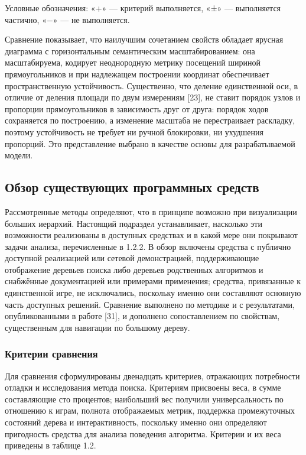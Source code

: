 Условные обозначения: «+» — критерий выполняется, «±» — выполняется частично, «−» — не выполняется.

Сравнение показывает, что наилучшим сочетанием свойств обладает ярусная диаграмма с горизонтальным семантическим масштабированием: она масштабируема, кодирует неоднородную метрику посещений шириной прямоугольников и при надлежащем построении координат обеспечивает пространственную устойчивость. Существенно, что деление единственной оси, в отличие от деления площади по двум измерениям [23], не ставит порядок узлов и пропорции прямоугольников в зависимость друг от друга: порядок ходов сохраняется по построению, а изменение масштаба не перестраивает раскладку, поэтому устойчивость не требует ни ручной блокировки, ни ухудшения пропорций. Это представление выбрано в качестве основы для разрабатываемой модели.

\subsection{Обзор существующих программных средств}

Рассмотренные методы определяют, что в принципе возможно при визуализации больших иерархий. Настоящий подраздел устанавливает, насколько эти возможности реализованы в доступных средствах и в какой мере они покрывают задачи анализа, перечисленные в 1.2.2. В обзор включены средства с публично доступной реализацией или сетевой демонстрацией, поддерживающие отображение деревьев поиска либо деревьев родственных алгоритмов и снабжённые документацией или примерами применения; средства, привязанные к единственной игре, не исключались, поскольку именно они составляют основную часть доступных решений. Сравнение выполнено по методике и с результатами, опубликованными в работе [31], и дополнено сопоставлением по свойствам, существенным для навигации по большому дереву.

\subsubsection{Критерии сравнения}

Для сравнения сформулированы двенадцать критериев, отражающих потребности отладки и исследования метода поиска. Критериям присвоены веса, в сумме составляющие сто процентов; наибольший вес получили универсальность по отношению к играм, полнота отображаемых метрик, поддержка промежуточных состояний дерева и интерактивность, поскольку именно они определяют пригодность средства для анализа поведения алгоритма. Критерии и их веса приведены в таблице 1.2.

